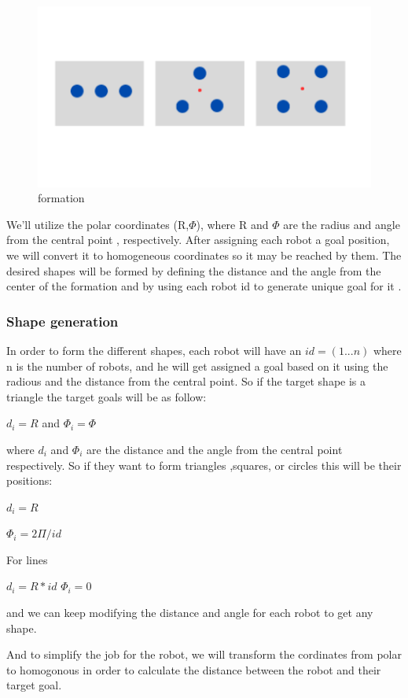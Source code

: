 \documentclass[12pt]{extarticle}
\begin{document}
 
 \begin{figure}[h]  
\centering
\includegraphics[scale=0.4]{formation}
\caption[formation]{formation}
\end{figure}

We'll utilize the polar coordinates (R,$\Phi$), where R and $\Phi$ are the radius and angle from the central point , respectively. After assigning each robot a goal position, we will convert it to homogeneous coordinates so  it may be reached  by them. The desired shapes will be formed by defining the distance and the angle  from the center of the formation and by using each robot id to generate unique goal for it .
\pagebreak
\subsubsection{Shape generation}

In order to form the different shapes, each robot will have an $id=(1...n)$ 
where n is the number of robots, and he will get assigned a goal based on it
using the radious and the distance from the central point. So if the target shape is a triangle the target goals will be as follow:

           $d_{i}=R$ and 
           $\Phi_{i}=\Phi$

where $d_{i}$ and  $\Phi_{i}$ are the distance and the angle from the central point respectively. So if they want to form triangles ,squares, or circles this will be their positions:


 			$d_{i}=R$

			$\Phi_{i}=2\Pi/id$

For lines

$d_{i}=R*id$
$\Phi_{i}=0$

and we can keep modifying the distance and angle for each robot to get any shape.

And to simplify the job for the robot, we will transform the cordinates from polar to homogonous in order to calculate the distance between the robot and their target goal. 
\end{document}
